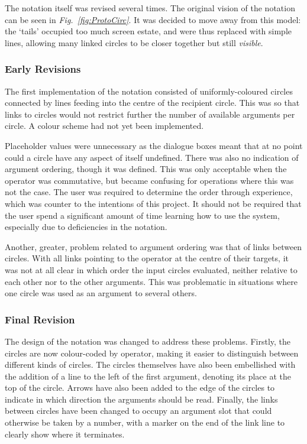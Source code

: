 \documentclass[12pt,twoside,notitlepage,xetex]{report}
\begin{document}
{The notation itself was revised several times.  The original vision of the notation can be seen in \emph{Fig.~\ref{fig:ProtoCirc}}.  It was decided to move away from this model: the `tails' occupied too much screen estate, and were thus replaced with simple lines, allowing many linked circles to be closer together but still \emph{visible}.

\subsubsection{Early Revisions}

The first implementation of the notation consisted of uniformly-coloured circles connected by lines feeding into the centre of the recipient circle.  This was so that links to circles would not restrict further the number of available arguments per circle.  A colour scheme had not yet been implemented.

Placeholder values were unnecessary as the dialogue boxes meant that at no point could a circle have any aspect of itself undefined.  There was also no indication of argument ordering, though it was defined.  This was only acceptable when the operator was commutative, but became confusing for operations where this was not the case. The user was required to determine the order through experience, which was counter to the intentions of this project.  It should not be required that the user spend a significant amount of time learning how to use the system, especially due to deficiencies in the notation.

Another, greater, problem related to argument ordering was that of links between circles.  With all links pointing to the operator at the centre of their targets, it was not at all clear in which order the input circles evaluated, neither relative to each other nor to the other arguments.  This was problematic in situations where one circle was used as an argument to several others.


\subsubsection{Final Revision}
The design of the notation was changed to address these problems.  Firstly, the circles are now colour-coded by operator, making it easier to distinguish between different kinds of circles.  The circles themselves have also been embellished with the addition of a line to the left of the first argument, denoting its place at the top of the circle.  Arrows have also been added to the edge of the circles to indicate in which direction the arguments should be read.  Finally, the links between circles have been changed to occupy an argument slot that could otherwise be taken by a number, with a marker on the end of the link line to clearly show where it terminates.

}
\end{document}

